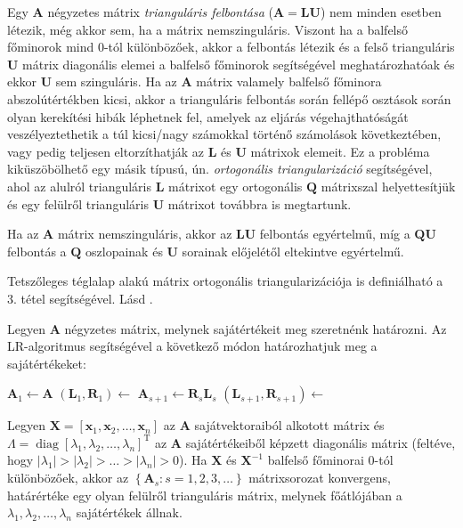 \documentclass[%
	DIV=15,appendixprefix]{scrreprt}
\theoremstyle{definition}
\theoremstyle{remark}
\DeclareMathOperator{\T}{T}
\DeclareMathOperator{\diag}{diag}
\begin{document}
Egy $ \mathbf{ A } $ négyzetes mátrix \emph{trianguláris felbontása} ($ \mathbf{ A } = \mathbf{ L }
\mathbf{ U } $) nem minden esetben létezik, még akkor sem, ha a mátrix nemszinguláris. Viszont ha a
balfelső főminorok mind 0-tól különbözőek, akkor a felbontás létezik és a felső trianguláris
$ \mathbf{ U } $ mátrix diagonális elemei a balfelső főminorok segítségével meghatározhatóak és
ekkor $ \mathbf{ U } $ sem szinguláris. Ha az $ \mathbf{ A } $ mátrix valamely balfelső főminora
abszolútértékben kicsi, akkor a trianguláris felbontás során fellépő osztások során olyan kerekítési
hibák léphetnek fel, amelyek az eljárás végehajthatóságát veszélyeztethetik a túl kicsi/nagy
számokkal történő számolások következtében, vagy pedig teljesen eltorzíthatják az $ \mathbf{ L } $
és $ \mathbf{ U } $ mátrixok elemeit. Ez a probléma kiküszöbölhető egy másik típusú, ún.
\emph{ortogonális triangularizáció} segítségével, ahol az alulról trianguláris $ \mathbf{ L } $
mátrixot egy ortogonális $ \mathbf{ Q } $ mátrixszal helyettesítjük és egy felülről trianguláris
$ \mathbf{ U } $ mátrixot továbbra is megtartunk.

Ha az $ \mathbf{ A } $ mátrix nemszinguláris, akkor az $ \mathbf{ L } \mathbf{ U } $ felbontás
egyértelmű, míg a $ \mathbf{ Q } \mathbf{ U } $ felbontás a $ \mathbf{ Q } $ oszlopainak és
$ \mathbf{ U } $ sorainak előjelétől eltekintve egyértelmű.

Tetszőleges téglalap alakú mátrix ortogonális triangularizációja is definiálható a 3. tétel
segítségével.
%
Lásd \cite[I. fejezet, 3. szakasz]{Moricz1997}.

Legyen $ \mathbf{ A } $ négyzetes mátrix, melynek sajátértékeit meg szeretnénk határozni. Az
LR-algoritmus segítségével a következő módon határozhatjuk meg a sajátértékeket:
\begin{algorithmic}[1]
	\State $ \mathbf{ A }_{ 1 } \gets \mathbf{ A }$
	\State $ \left( \mathbf{ L }_{ 1 },{} \mathbf{ R }_{ 1 } \right) \gets $
		\State $ \mathbf{ A }_{ s + 1 } \gets \mathbf{ R }_{ s } \mathbf{ L }_{ s } $
		\State $ \left( \mathbf{ L }_{ s + 1 },{} \mathbf{ R }_{ s + 1 } \right) \gets $ 
	\EndFor
\end{algorithmic}

Legyen $ \mathbf{ X } = \left[ \mathbf{ x }_{ 1 },{} \mathbf{ x }_{ 2 }, \ldots,{}
\mathbf{ x }_{ n } \right] $ az $ \mathbf{ A } $ sajátvektoraiból alkotott mátrix és $ \Lambda =
\diag \left[ \lambda_{ 1 },{} \lambda_{ 2 },{} \ldots,{} \lambda_{ n } \right]^{ \T } $ az
$ \mathbf{ A } $ sajátértékeiből képzett diagonális mátrix (feltéve, hogy $ \left| \lambda_{ 1 }
\right| > \left| \lambda_{ 2 } \right| > \ldots > \left| \lambda_{ n } \right| > 0 $). Ha
$ \mathbf{ X } $ és $ \mathbf{ X }^{ - 1 } $ balfelső főminorai 0-tól különbözőek, akkor az
$ \left\{ \mathbf{ A }_{ s } \colon s = 1,{} 2,{} 3,{} \ldots \right\} $ mátrixsorozat konvergens,
határértéke egy olyan felülről trianguláris mátrix, melynek főátlójában a $ \lambda_{ 1 },{}
\lambda_{ 2 },{} \ldots,{} \lambda_{ n } $ sajátértékek állnak.
\end{document}
